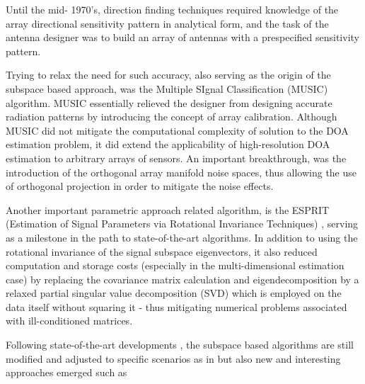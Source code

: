 Until the mid- 1970's, direction finding techniques required knowledge of the array directional sensitivity pattern in analytical form, and the task of the antenna designer was to build an array of antennas with a prespecified sensitivity pattern.
\par
Trying to relax the need for such accuracy, also serving as the origin of the subspace based approach, was the Multiple SIgnal Classification (MUSIC) \cite{schmidt1986multiple} algorithm.
MUSIC essentially relieved the designer from designing accurate radiation patterns by introducing the concept of array calibration.
Although MUSIC did not mitigate the computational complexity of solution to the DOA estimation problem, it did extend the applicability of high-resolution DOA estimation to arbitrary arrays of sensors.
An important breakthrough, was the introduction of the orthogonal array manifold noise spaces, thus allowing the use of orthogonal projection in order to mitigate the noise effects.
\par
Another important parametric approach related algorithm, is the ESPRIT (Estimation of Signal Parameters via Rotational Invariance Techniques) \cite{ESPRIT}, serving as a milestone in the path to state-of-the-art algorithms.
In addition to using the rotational invariance of the signal subspace eigenvectors, it also reduced computation and storage costs (especially in the multi-dimensional estimation case) by replacing the covariance matrix calculation and eigendecomposition by a relaxed partial singular value decomposition (SVD) which is employed on the data itself without squaring it - thus mitigating numerical problems associated with ill-conditioned matrices.
\par
Following state-of-the-art developments \cite{tuncer2009classical}, the subspace based algorithms are still modified and adjusted to specific scenarios as in \cite{LpNorm_MUSIC} but also new and interesting approaches emerged such as
